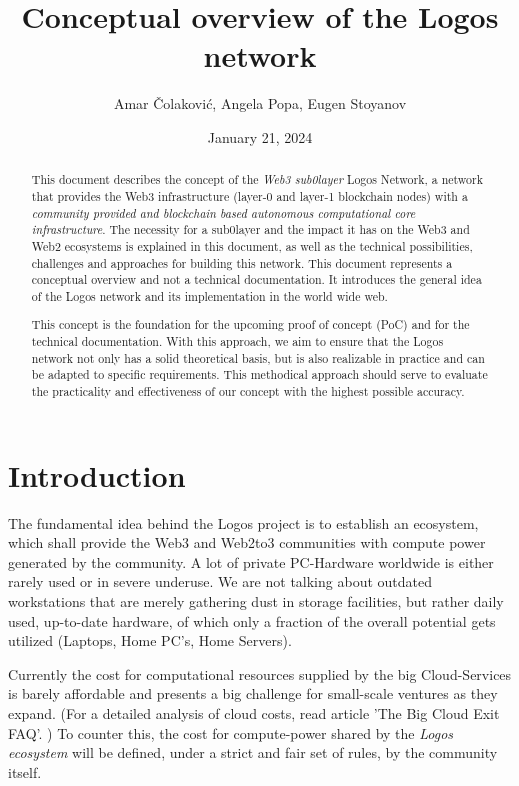 \documentclass[]{article}
\title{Conceptual overview of the Logos network}
\author{Amar Čolaković, Angela Popa, Eugen Stoyanov}
\affil{LogosLabs}
\date{January 21, 2024}
\begin{document}
\maketitle

\begin{abstract}
This document describes the concept of the \textit{Web3 sub0layer} Logos Network, a network that provides the Web3 infrastructure (layer-0 and layer-1 blockchain nodes) with a \textit{community provided and blockchain based autonomous computational core infrastructure}.
The necessity for a sub0layer and the impact it has on the Web3 and Web2 ecosystems is explained in this document, as well as the technical possibilities, challenges and approaches for building this network.   
This document represents a conceptual overview and not a technical documentation. It introduces the general idea of the Logos network and its implementation in the world wide web.

This concept is the foundation for the upcoming proof of concept (PoC) and for the technical documentation. 
With this approach, we aim to ensure that the Logos network not only has a solid theoretical basis, but is also realizable in practice and can be adapted to specific requirements.
This methodical approach should serve to evaluate the practicality and effectiveness of our concept with the highest possible accuracy.    
\end{abstract}

\tableofcontents
\newpage

\section{Introduction}
The fundamental idea behind the Logos project is to establish an ecosystem, which shall provide the Web3 and Web2to3 communities with compute power generated by the community.
A lot of private PC-Hardware worldwide is either rarely used or in severe underuse. 
We are not talking about outdated workstations that are merely gathering dust in storage facilities, but rather daily used, up-to-date hardware, of which only a fraction of the overall potential gets utilized (Laptops, Home PC’s, Home Servers).

Currently the cost for computational resources supplied by the big Cloud-Services is barely affordable and presents a big challenge for small-scale ventures as they expand. (For a detailed analysis of cloud costs, read article 'The Big Cloud Exit FAQ'. \cite{david-hainemeier-hansson})
To counter this, the cost for compute-power shared by the \textit{Logos ecosystem} will be defined, under a strict and fair set of rules, by the community itself.
\end{document}
